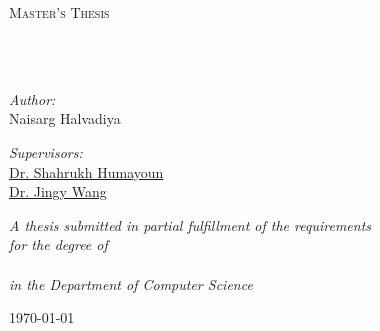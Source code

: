 \documentclass[
12pt,
english,
onehalfspacing,
headsepline,
draft,  %
]{MastersDoctoralThesis}
\title{#2}
\author{Naisarg Halvadiya}
\begin{document}
\frontmatter

\let\cleardoublepage\clearpage

\pagestyle{plain}


\begin{singlespacing}


\begin{titlepage}
\begin{center}

\vspace*{.06\textheight}

{\scshape\LARGE \textcolor{SFSUPurple}{\univname}\par}\vspace{1.5cm}

\textsc{\Large Master's Thesis}\\[0.5cm]

\HRule \\[0.4cm]

{\huge\bfseries \ttitle\par}\vspace{0.4cm}

\HRule \\[1.5cm]

\begin{flushleft}
\emph{Author:}\\
Naisarg Halvadiya
\end{flushleft}

\begin{flushleft}
\emph{Supervisors:}\\
\href{https://faculty.sfsu.edu/~humayoun/}{\textcolor{SFSUPurple}{Dr. Shahrukh Humayoun}}\\
\href{}{\textcolor{SFSUPurple}{Dr. Jingy Wang}}
\end{flushleft}

\vfill

\large \textit{A thesis submitted in partial fulfillment of the requirements\\
for the degree of \degreename\\~\\
in the Department of Computer Science}\\[0.3cm]

\vfill

{\large \today}\\[4cm]

\end{center}
\end{titlepage}

\restoregeometry

\end{singlespacing}
\end{document}

